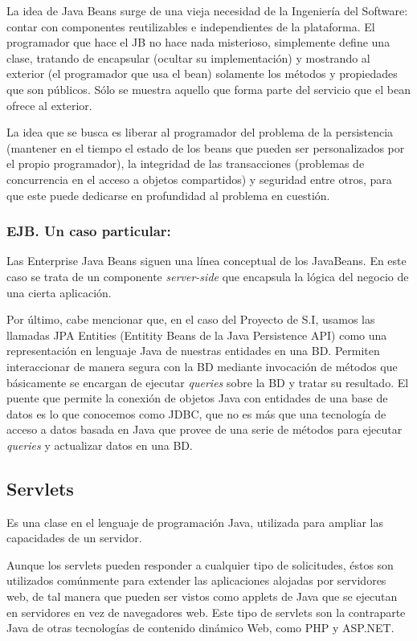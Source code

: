 \documentclass{apuntes}
\begin{document}
La idea de Java Beans surge de una vieja necesidad de la Ingeniería del Software: contar con componentes reutilizables e independientes de la plataforma. El programador que hace el JB no hace nada misterioso, simplemente define una clase, tratando de encapsular (ocultar su implementación) y mostrando al exterior (el programador que usa el bean) solamente los métodos y propiedades que son públicos. Sólo se muestra aquello que forma parte del servicio que el bean ofrece al exterior.

La idea que se busca es liberar al programador del problema de la persistencia (mantener en el tiempo el estado de los beans que pueden ser personalizados por el propio programador), la integridad de las transacciones (problemas de concurrencia en el acceso a  objetos compartidos) y seguridad entre otros, para que este puede dedicarse en profundidad al problema en cuestión.


\subsubsection{EJB. Un caso particular:}
Las Enterprise Java Beans siguen una línea conceptual de los JavaBeans. En este caso se trata de un componente \emph{server-side} que encapsula la lógica del negocio de una cierta aplicación.

 Por último, cabe mencionar que, en el caso del Proyecto de S.I, usamos las llamadas JPA Entities (Entitity Beans de la Java Persistence API) como  una representación en lenguaje Java de nuestras entidades en una BD. Permiten interaccionar de manera segura con  la BD mediante invocación de métodos  que básicamente se encargan de ejecutar \emph{queries} sobre la BD y tratar su resultado. El puente que permite la conexión de objetos Java con entidades de una base de datos es lo que conocemos como JDBC, que no es más que una tecnología de acceso a datos basada en Java que provee de una serie de métodos para ejecutar \emph{queries} y actualizar datos en una BD. 
 
\newpage
\subsection{Servlets}
\begin{defn}[Servlet]
Es una clase en el lenguaje de programación Java, utilizada para ampliar las capacidades de un servidor.
\end{defn}

Aunque los servlets pueden responder a cualquier tipo de solicitudes, éstos son utilizados comúnmente para extender las aplicaciones alojadas por servidores web, de tal manera que pueden ser vistos como applets de Java que se ejecutan en servidores en vez de navegadores web. Este tipo de servlets son la contraparte Java de otras tecnologías de contenido dinámico Web, como PHP y ASP.NET.
\end{document}
